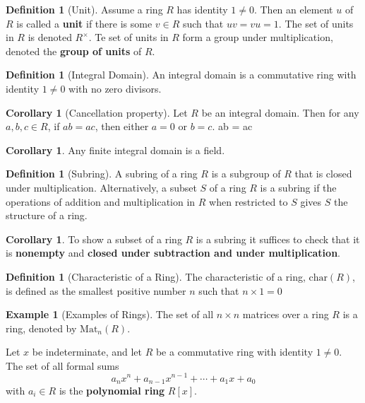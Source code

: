 \documentclass[10pt, oneside, reqno]{amsart}
\theoremstyle{plain}%
\theoremstyle{definition}
\newtheorem{defn}[thm]{Definition}
\newtheorem{exmp}[thm]{Example}
\newtheorem{cor}[thm]{Corollary}
\theoremstyle{remark}
\newcommand{\charr}[1]{\text{char}(#1)}
\begin{document}
\begin{defn}[Unit]
	Assume a ring $R$ has identity $1 \neq 0$.  Then an element $u$ of $R$ is called a \textbf{unit} if there is some $v \in R$ such that $uv = vu = 1$.  The set of units in $R$ is denoted $R^{\times}$.  Te set of units in $R$ form a group under multiplication, denoted the \textbf{group of units} of $R$.
\end{defn}

\begin{defn}[Integral Domain]
	An integral domain is a commutative ring with identity $1 \neq 0$ with no zero divisors.
\end{defn}

\begin{cor}[Cancellation property]
	Let $R$ be an integral domain.  Then for any $a,b,c \in R$, if $ab = ac$, then either $a = 0$ or $b = c$. 
		ab = ac 
\end{cor}

\begin{cor}
	Any finite integral domain is a field.
\end{cor}

\begin{defn}[Subring]
	A subring of a ring $R$ is a subgroup of $R$ that is closed under multiplication.  Alternatively, a subset $S$ of a ring $R$ is a subring if the operations of addition and multiplication in $R$ when restricted to $S$ gives $S$ the structure of a ring.    
\end{defn}

\begin{cor}
	To show a subset of a ring $R$ is a subring it suffices to check that it is \textbf{nonempty} and \textbf{closed under subtraction and under multiplication}.
\end{cor}

\begin{defn}[Characteristic of a Ring]
	The characteristic of a ring, $\charr{R}$, is defined as the smallest positive number $n$ such that $ n \times 1 = 0$
\end{defn}

\begin{exmp}[Examples of Rings]
	The set of all $n \times n$ matrices over a ring $R$ is a ring, denoted by $\text{Mat}_n(R)$.
	
	Let $x$ be indeterminate, and let $R$ be a commutative ring with identity $1 \neq 0$.  The set of all formal sums \[
		a_n x^n + a_{n-1} x^{n-1} + \cdots + a_1 x + a_0 
	\] with $a_i \in R$ is the \textbf{polynomial ring} $R[x]$.
\end{exmp}
\end{document}
